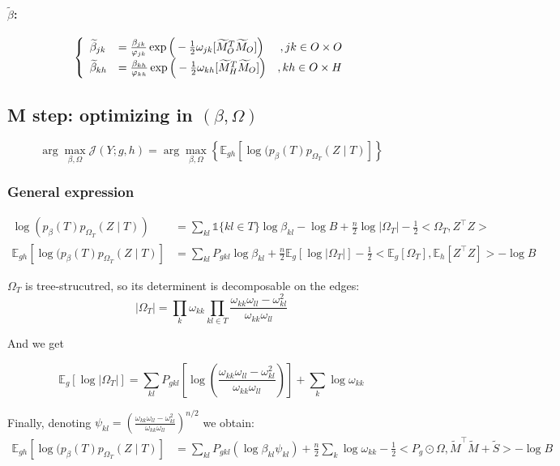 \documentclass[11pt,a4paper]{article}
\newcommand{\argmax}{\arg\!\max}
\newcommand{\Esp}{\mathds{E}}
\begin{document}
\paragraph{$\widetilde{\beta}$:}

\[\left\{\begin{array}{ll r}
\widetilde{\beta}_{jk} &= \frac{\beta_{jk}}{\varphi_{jk}}\exp\Big(-\frac{1}{2} \omega_{jk}[\widetilde{M}_O^T \widetilde{M}_O]\Big) & ,jk \in O\times O\\
\widetilde{\beta}_{kh} &=\frac{\beta_{kh}}{\varphi_{kh}}\exp\Big(-\frac{1}{2} \omega_{kh}[\widetilde{M}_H^T \widetilde{M}_O]\Big) & ,kh \in O\times H
\end{array}\right.\]

\subsection{M step: optimizing in $(\beta, \Omega)$}
 
$$ \argmax_{\beta, \Omega} \mathcal{J}(Y ; g,h) =\argmax_{\beta, \Omega} \left\{ \Esp_{gh} [\log (p_\beta(T)p_{\Omega_T}(Z\mid T) ]\right\} $$

\subsubsection{General expression}
\begin{align*}
\log (p_\beta(T)p_{\Omega_T}(Z\mid T))  &= \sum_{kl} \mathds{1}\{kl \in T\} \log \beta_{kl} - \log B + \frac{n}{2}\log |\Omega_T| - \frac{1}{2}<\Omega_T,Z^\intercal Z>\\
\Esp_{gh} [\log (p_\beta(T)p_{\Omega_T}(Z\mid T) ] &= \sum_{kl} P_{gkl} \log\beta_{kl} +\frac{n}{2} \Esp_g[\log |\Omega_T|] -\frac{1}{2} <\Esp_g [\Omega_T], \Esp_h[Z^\intercal Z]>- \log B
\end{align*}

$\Omega_T$ is tree-strucutred, so its determinent is decomposable on the edges:
$$|\Omega_{T}| = \prod_{k} \omega_{kk} \prod_{kl \in T} \frac{\omega_{kk}\omega_{ll}-\omega_{kl}^2}{\omega_{kk}\omega_{ll}}$$

And we get

$$\Esp_g[\log |\Omega_{T}|]= \sum _{kl} P_{gkl} \left[ \log\left(\frac{\omega_{kk}\omega_{ll}-\omega_{kl}^2}{\omega_{kk}\omega_{ll}}\right)\right] + \sum_k \log \omega_{kk}$$

Finally, denoting $\psi_{kl} = \left(\frac{\omega_{kk}\omega_{ll}-\omega_{kl}^2}{\omega_{kk}\omega_{ll}}\right)^{n/2}$ we obtain:
\begin{align*}
\Esp_{gh} [\log (p_\beta(T)p_{\Omega_T}(Z\mid T) ] &=\sum_{kl} P_{gkl} \left(\log  \beta_{kl}\psi_{kl}\right) + \frac{n}{2}\sum_k \log \omega_{kk} - \frac{1}{2}<P_g \odot \Omega, \widetilde{M}^\intercal \widetilde{M} + \widetilde{S}>- \log B
\end{align*}
 
\end{document}

